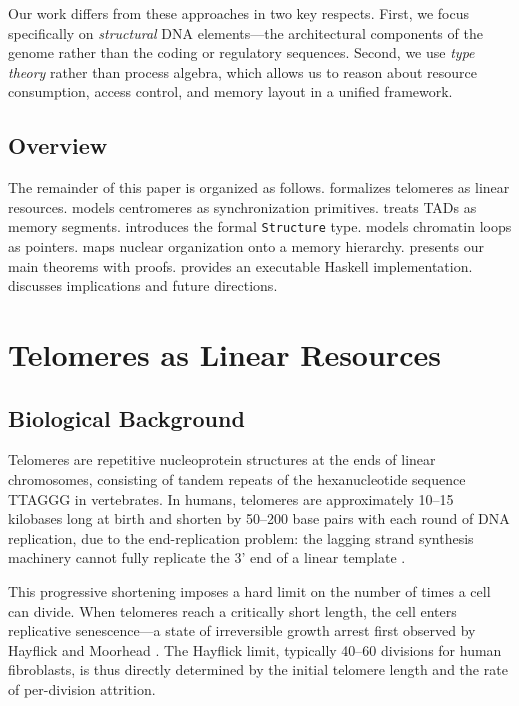 \documentclass[12pt,a4paper]{article}
\theoremstyle{plain}
\theoremstyle{definition}
\begin{document}
Our work differs from these approaches in two key respects. First, we focus specifically on \emph{structural} DNA elements---the architectural components of the genome rather than the coding or regulatory sequences. Second, we use \emph{type theory} rather than process algebra, which allows us to reason about resource consumption, access control, and memory layout in a unified framework.

\subsection{Overview}

The remainder of this paper is organized as follows.  formalizes telomeres as linear resources.  models centromeres as synchronization primitives.  treats TADs as memory segments.  introduces the formal \texttt{Structure} type.  models chromatin loops as pointers.  maps nuclear organization onto a memory hierarchy.  presents our main theorems with proofs.  provides an executable Haskell implementation.  discusses implications and future directions.


\section{Telomeres as Linear Resources}\label{sec:telomeres}

\subsection{Biological Background}

Telomeres are repetitive nucleoprotein structures at the ends of linear chromosomes, consisting of tandem repeats of the hexanucleotide sequence TTAGGG in vertebrates. In humans, telomeres are approximately 10--15 kilobases long at birth and shorten by 50--200 base pairs with each round of DNA replication, due to the end-replication problem: the lagging strand synthesis machinery cannot fully replicate the 3' end of a linear template \cite{blackburn2001telomere, olovnikov1973theory}.

This progressive shortening imposes a hard limit on the number of times a cell can divide. When telomeres reach a critically short length, the cell enters replicative senescence---a state of irreversible growth arrest first observed by Hayflick and Moorhead \cite{hayflick1961serial}. The Hayflick limit, typically 40--60 divisions for human fibroblasts, is thus directly determined by the initial telomere length and the rate of per-division attrition.
\end{document}
